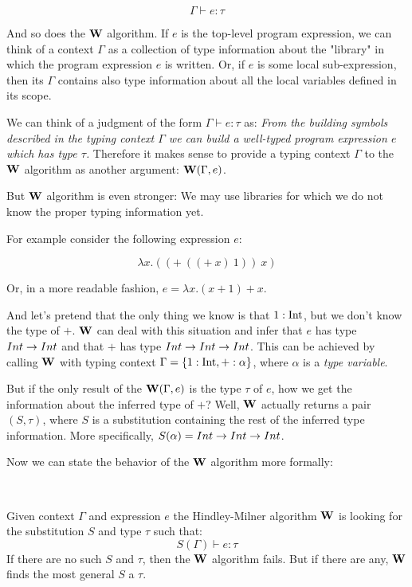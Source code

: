 \documentclass[a4paper,oneside]{memoir}
\begin{document}
$$\Gamma \vdash e : \tau$$

And so does the $\operatorname{\textbf{W}}$ algorithm.
If $e$ is the top-level program expression,
we can think of a context $\Gamma$ as a collection of type information about the "library"
in which the program expression $e$ is written.
Or, if $e$ is some local sub-expression, then its $\Gamma$ contains also type information about
all the local variables defined in its scope.

We can think of a judgment of the form $\Gamma \vdash e : \tau$ as: 
\textit{From the building symbols described in the typing context $\Gamma$ we can build 
a well-typed program expression $e$ which has type $\tau$.}
Therefore it makes sense to provide a typing context $\Gamma$ to the $\operatorname{\textbf{W}}$ algorithm as another argument: $\operatorname{\textbf{W}}(\Gamma, e)$.

But $\operatorname{\textbf{W}}$ algorithm is even stronger: We may use libraries for which we do not know the proper typing information yet.

For example consider the following expression $e$:

$$ \lambda x . ((+~((+~x)~1))~x) $$

Or, in a more readable fashion, $e = \lambda x . (x+1)+x $.


And let's pretend that the only thing we know is that $1 : \operatorname{Int}$, 
but we don't know the type of $+$. 
$\operatorname{\textbf{W}}$ can deal with this situation and infer that $e$ has type $Int \rightarrow Int$ and
that $+$ has type $Int \rightarrow Int \rightarrow Int$. This can be achieved by calling $\operatorname{\textbf{W}}$ with
typing context $\Gamma = \{ 1 : \operatorname{Int}, + : \alpha \}$, 
where $\alpha$ is a \textit{type variable}.

But if the only result of the $\operatorname{\textbf{W}}(\Gamma,e)$ is the type $\tau$ of $e$, 
how we get the information about the inferred type of $+$? 
Well, $\operatorname{\textbf{W}}$ actually returns a pair $(S, \tau)$, where $S$ is a substitution
containing the rest of the inferred type information. 
More specifically, $S(\alpha) = Int \rightarrow Int \rightarrow Int$.  

Now we can state the behavior of the $\operatorname{\textbf{W}}$ algorithm more formally:

~

Given context $\Gamma$ and expression $e$ the Hindley-Milner algorithm $\operatorname{\textbf{W}}$ 
is looking for the substitution $S$ and type $\tau$ such that: 
$$ S(\Gamma) \vdash e : \tau $$
If there are no such $S$ and $\tau$, then the $\operatorname{\textbf{W}}$ algorithm fails.
But if there are any, $\operatorname{\textbf{W}}$ finds the most general $S$ a $\tau$.

\newcommand{\SPr}{S^\prime}
\end{document}
